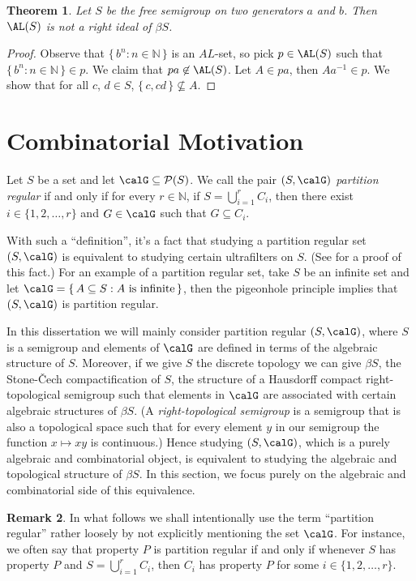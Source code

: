 \documentclass[12pt]{article}
\theoremstyle{plain}
\newtheorem{thm}{Theorem}[section]
\theoremstyle{definition}
\newtheorem{rmk}[thm]{Remark}
\newcommand{\bbN}{\mathbb{N}}
\newcommand{\calP}{\mathcal{P}}
\begin{document}
\begin{thm}
  Let $S$ be the free semigroup on two generators $a$ and $b$.
  Then $\AL(S)$ is not a right ideal of $\beta S$.
\end{thm}
\begin{proof}
  Observe that $\{\, b^n : n \in \bbN \,\}$ is an $AL$-set, so pick $p
  \in \AL(S)$ such that $\{\, b^n : n \in \bbN \,\} \in p$. 
  We claim that $pa \not\in \AL(S)$. 
  Let $A \in pa$, then $Aa^{-1} \in p$.
  We show that for all $c$, $d \in S$, $\{\, c, cd \,\} \not\subseteq
  A$. 
\end{proof}


\section{Combinatorial Motivation} 
Let $S$ be a set and let $\calG \subseteq \calP(S)$.
We call the pair $(S, \calG)$ \textsl{partition regular} if and only
if for every $r \in \bbN$, if $S = \bigcup_{i=1}^r C_i$, then there
exist $i \in \{1, 2, \ldots, r\}$ and $G \in \calG$ such that $G
\subseteq C_i$. 

With such a ``definition'', it's a fact that studying a partition
regular set $(S, \calG)$ is equivalent to studying certain ultrafilters on
$S$. 
(See \cite[Theorem 5.7]{Hindman:1998fk} for a proof of this fact.)
For an example of a partition regular set, take $S$ be an infinite set
and let $\calG = \{\, A \subseteq S : \mbox{$A$ is infinite} \,\}$, then the
pigeonhole principle implies that $(S, \calG)$ is partition regular.

In this dissertation we will mainly consider partition regular $(S,
\calG)$, where $S$ is a semigroup and elements of $\calG$ are defined
in terms of the algebraic structure of $S$.
Moreover, if we give $S$ the discrete topology we can give $\beta S$,
the Stone-\v{C}ech compactification of $S$, the structure of a Hausdorff
compact right-topological semigroup 
such that elements in $\calG$ are associated with certain algebraic
structures of $\beta S$. 
(A \textsl{right-topological semigroup} is a semigroup that is also a
topological space such that for every element $y$ in our semigroup the
function $x \mapsto xy$ is continuous.)
Hence studying $(S, \calG)$, which is a purely algebraic and
combinatorial object, is equivalent to studying the algebraic and
topological structure of $\beta S$. 
In this section, we focus purely on the algebraic and combinatorial
side of this equivalence.

\begin{rmk}
  In what follows we shall intentionally use the term ``partition
  regular'' rather loosely by not explicitly mentioning the set
  $\calG$. 
  For instance, we often say that property $P$ is partition regular if
  and only if whenever $S$ has property $P$ and $S = \bigcup_{i=1}^r
  C_i$, then $C_i$ has property $P$ for some $i \in \{1, 2, \ldots,
  r\}$. 
\end{rmk}
\end{document}

